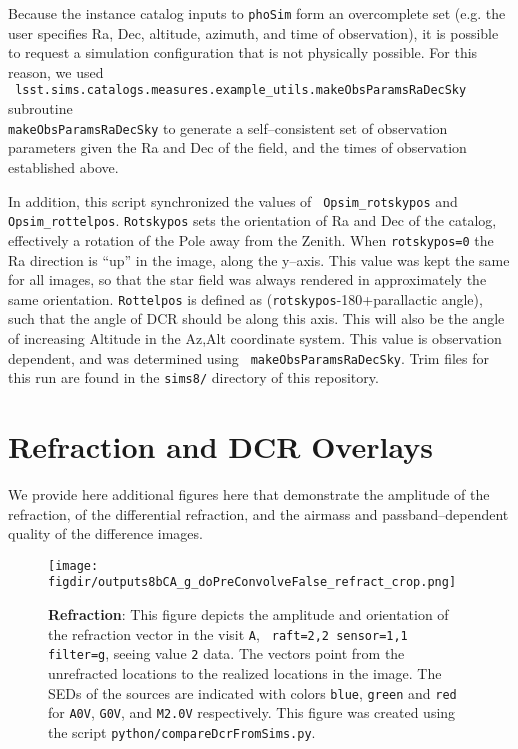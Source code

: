 \documentclass[prd, nofootinbib, floatfix, 11pt, tightenlines, times]{article}
\def\figdir{../figures}
\def\A{{\tt A}}
\begin{document}
\begin{appendices}
Because the instance catalog inputs to {\tt phoSim} form an
overcomplete set (e.g. the user specifies Ra, Dec, altitude, azimuth,
and time of observation), it is possible to request a simulation
configuration that is not physically possible.  For this reason, we
used \\{\tt
  lsst.sims.catalogs.measures.example\_utils.makeObsParamsRaDecSky}
subroutine \\{\tt makeObsParamsRaDecSky} to generate a self--consistent
set of observation parameters given the Ra and Dec of the field, and
the times of observation established above.

In addition, this script synchronized the values of {\tt
  Opsim\_rotskypos} and {\tt Opsim\_rottelpos}.  {\tt Rotskypos} sets
the orientation of Ra and Dec of the catalog, effectively a rotation
of the Pole away from the Zenith.  When {\tt rotskypos=0} the Ra
direction is ``up'' in the image, along the y--axis.  This value was
kept the same for all images, so that the star field was always
rendered in approximately the same orientation.  {\tt Rottelpos} is
defined as ({\tt rotskypos}-180+parallactic angle), such that the
angle of DCR should be along this axis.  This will also be the angle
of increasing Altitude in the Az,Alt coordinate system.  This value is
observation dependent, and was determined using {\tt
  makeObsParamsRaDecSky}.  Trim files for this run are found in the
{\tt sims8/} directory of this repository.

\section{Refraction and DCR Overlays}

We provide here additional figures here that demonstrate the amplitude
of the refraction, of the differential refraction, and the airmass and
passband--dependent quality of the difference images.

\begin{figure}[!ht]
  \centering
  \texttt{[image: \\figdir/outputs8bCA\_g\_doPreConvolveFalse\_refract\_crop.png]}
  \caption{{\bf Refraction}: This figure depicts the amplitude and
    orientation of the refraction vector in the visit \A, {\tt
      raft=2,2 sensor=1,1 filter=g}, seeing value {\tt 2} data.  The
    vectors point from the unrefracted locations to the realized
    locations in the image.  The SEDs of the sources are indicated
    with colors {\tt blue}, {\tt green} and {\tt red} for {\tt A0V},
    {\tt G0V}, and {\tt M2.0V} respectively.  This figure was created
    using the script {\tt python/compareDcrFromSims.py}.}
  \label{fig:refractim}
\end{figure}


\end{appendices}
\end{document}
